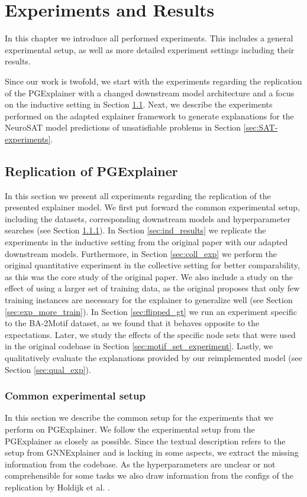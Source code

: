 \chapter{Experiments and Results}
\label{ch:Experiments}

In this chapter we introduce all performed experiments. This includes a general experimental setup, as well as more detailed experiment settings including their results.

Since our work is twofold, we start with the experiments regarding the replication of the PGExplainer with a changed downstream model architecture and a focus on the inductive setting in Section \ref{sec:experiments_replication}. Next, we describe the experiments performed on the adapted explainer framework to generate explanations for the NeuroSAT model predictions of unsatisfiable problems in Section \ref{sec:SAT-experiments}.

\section{Replication of PGExplainer}
\label{sec:experiments_replication}
In this section we present all experiments regarding the replication of the presented explainer model. We first put forward the common experimental setup, including the datasets, corresponding downstream models and hyperparameter searches (see Section \ref{sec:PGE_exp_setup}). In Section \ref{sec:ind_results} we replicate the experiments in the inductive setting from the original paper with our adapted downstream models. Furthermore, in Section \ref{sec:coll_exp} we perform the original quantitative experiment in the collective setting for better comparability, as this was the core study of the original paper. We also include a study on the effect of using a larger set of training data, as the original proposes that only few training instances are necessary for the explainer to generalize well (see Section \ref{sec:exp_more_train}). In Section \ref{sec:flipped_gt} we run an experiment specific to the BA-2Motif dataset, as we found that it behaves opposite to the expectations. Later, we study the effects of the specific node sets that were used in the original codebase in Section \ref{sec:motif_set_experiment}. Lastly, we qualitatively evaluate the explanations provided by our reimplemented model (see Section \ref{sec:qual_exp}).

\subsection{Common experimental setup}
\label{sec:PGE_exp_setup}
In this section we describe the common setup for the experiments that we perform on PGExplainer.
We follow the experimental setup from the PGExplainer as closely as possible. Since the textual description refers to the setup from GNNExplainer and is lacking in some aspects, we extract the missing information from the codebase. As the hyperparameters are unclear or not comprehensible for some tasks we also draw information from the configs of the replication by Holdijk et al. \cite{holdijk2021re}. \bigskip

